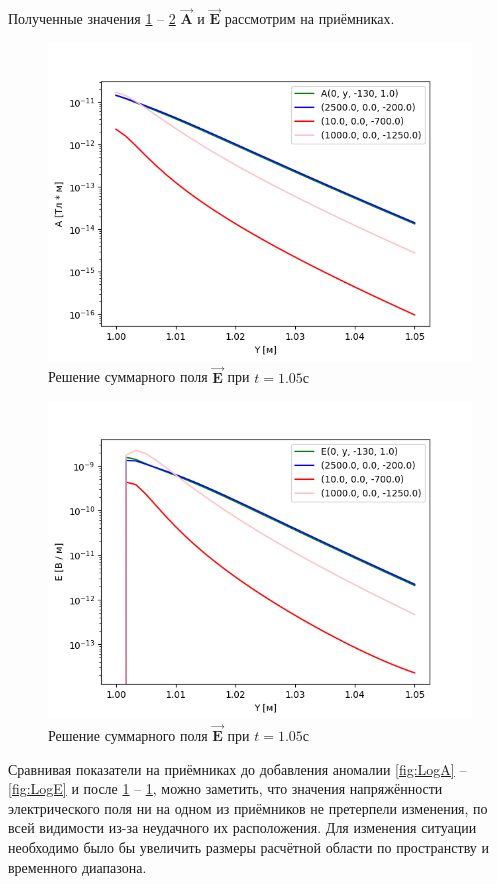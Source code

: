 Полученные значения \ref{fig:A_Log_added2} -- \ref{fig:E_Log_added2} $\overrightarrow{\textbf{A}}$ и $\overrightarrow{\textbf{E}}$ рассмотрим на приёмниках.

\begin{figure}
	\centering
	\includegraphics[width=0.8\linewidth]{images/Log_A_obj2.png}
	\caption{Решение суммарного поля $\overrightarrow{\textbf{E}}$ при $t = 1.05с$}
	\label{fig:A_Log_added2}
\end{figure} 


\begin{figure}
	\centering
	\includegraphics[width=0.8\linewidth]{images/Log_E_obj2.png}
	\caption{Решение суммарного поля $\overrightarrow{\textbf{E}}$ при $t = 1.05с$}
	\label{fig:E_Log_added2}
\end{figure} 

Сравнивая показатели на приёмниках до добавления аномалии \ref{fig:LogA} -- \ref{fig:LogE} и после \ref{fig:A_Log_added2} -- \ref{fig:A_Log_added2}, можно заметить, что значения напряжённости электрического поля ни на одном из приёмников не претерпели изменения, по всей видимости из-за неудачного их расположения. Для изменения ситуации необходимо было бы увеличить размеры расчётной области по пространству и временного диапазона. 

